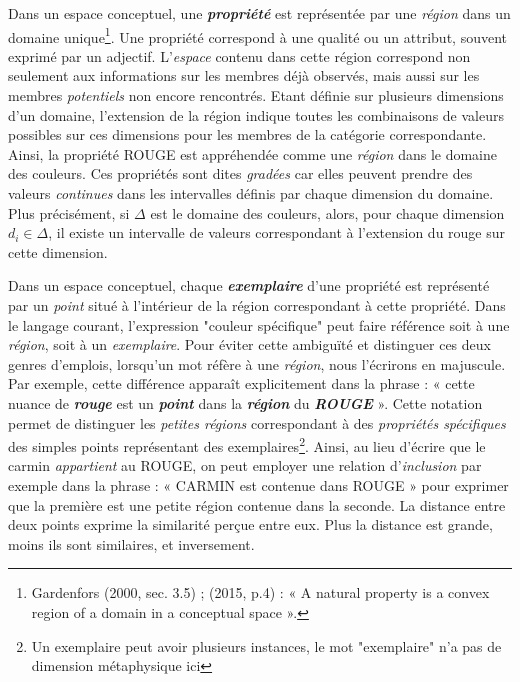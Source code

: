 \documentclass{article}
\newcommand{\bolditalic}[1]{\textbf{\textit{#1}}}
\begin{document}
Dans un espace conceptuel, une \bolditalic{propriété} est représentée par une \textit{région} dans un domaine unique\footnote{Gardenfors (2000, sec. 3.5) ; (2015, p.4) : « A natural property is a convex region of a domain in a conceptual space ».}. Une propriété correspond à une qualité ou un attribut, souvent exprimé par un adjectif. L'\textit{espace} contenu dans cette région correspond non seulement aux informations sur les membres déjà observés, mais aussi sur les membres \textit{potentiels} non encore rencontrés. Etant définie sur plusieurs dimensions d'un domaine, l’extension de la région indique toutes les combinaisons de valeurs possibles sur ces dimensions pour les membres de la catégorie correspondante. Ainsi, la propriété ROUGE est appréhendée comme une \textit{région} dans le domaine des couleurs. Ces propriétés sont dites \textit{gradées} car elles peuvent prendre des valeurs \textit{continues} dans les intervalles définis par chaque dimension du domaine. Plus précisément, si $\Delta$ est le domaine des couleurs, alors, pour chaque dimension $d_i \in \Delta$, il existe un intervalle de valeurs correspondant à l'extension du rouge sur cette dimension.
\par
Dans un espace conceptuel, chaque \bolditalic{exemplaire} d'une propriété est représenté par un \textit{point} situé à l'intérieur de la région correspondant à cette propriété. Dans le langage courant, l'expression "couleur spécifique" peut faire référence soit à une \textit{région}, soit à un \textit{exemplaire}. Pour éviter cette ambiguïté et distinguer ces deux genres d’emplois, lorsqu’un mot réfère à une \textit{région}, nous l'écrirons en majuscule. Par exemple, cette différence apparaît explicitement dans la phrase : « cette nuance de \bolditalic{rouge} est un \bolditalic{point} dans la \bolditalic{région} du \bolditalic{ROUGE} ». Cette notation permet de distinguer les \textit{petites régions} correspondant à des \textit{propriétés spécifiques} des simples points représentant des exemplaires\footnote{Un exemplaire peut avoir plusieurs instances, le mot "exemplaire" n'a pas de dimension métaphysique ici}. Ainsi, au lieu d’écrire que le carmin \textit{appartient} au ROUGE, on peut employer une relation d'\textit{inclusion} par exemple dans la phrase : « CARMIN est contenue dans ROUGE » pour exprimer que la première est une petite région contenue dans la seconde. La distance entre deux points exprime la similarité perçue entre eux. Plus la distance est grande, moins ils sont similaires, et inversement.
\par
\end{document}

